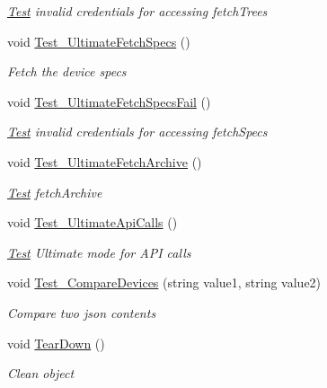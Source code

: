 \begin{DoxyCompactItemize}
\begin{DoxyCompactList}\small\item\em \hyperlink{namespace_h_d3_1_1_test}{Test} invalid credentials for accessing fetch\+Trees \end{DoxyCompactList}\item 
void \hyperlink{class_h_d3_1_1_test_1_1_h_d3_test_a73c8a709ce5f3dc9a3d4a5d1fed40cec}{Test\+\_\+\+Ultimate\+Fetch\+Specs} ()
\begin{DoxyCompactList}\small\item\em Fetch the device specs \end{DoxyCompactList}\item 
void \hyperlink{class_h_d3_1_1_test_1_1_h_d3_test_a9ff4c2f730c4e143315e358e0d642b82}{Test\+\_\+\+Ultimate\+Fetch\+Specs\+Fail} ()
\begin{DoxyCompactList}\small\item\em \hyperlink{namespace_h_d3_1_1_test}{Test} invalid credentials for accessing fetch\+Specs \end{DoxyCompactList}\item 
void \hyperlink{class_h_d3_1_1_test_1_1_h_d3_test_ab65dccff58ba727eeda7fcfce6ddb33d}{Test\+\_\+\+Ultimate\+Fetch\+Archive} ()
\begin{DoxyCompactList}\small\item\em \hyperlink{namespace_h_d3_1_1_test}{Test} fetch\+Archive \end{DoxyCompactList}\item 
void \hyperlink{class_h_d3_1_1_test_1_1_h_d3_test_a2fd12540acb809b5484317fb8add66e1}{Test\+\_\+\+Ultimate\+Api\+Calls} ()
\begin{DoxyCompactList}\small\item\em \hyperlink{namespace_h_d3_1_1_test}{Test} Ultimate mode for A\+P\+I calls \end{DoxyCompactList}\item 
void \hyperlink{class_h_d3_1_1_test_1_1_h_d3_test_a533abdaad86f0ce2ee427bfdb7449eba}{Test\+\_\+\+Compare\+Devices} (string value1, string value2)
\begin{DoxyCompactList}\small\item\em Compare two json contents \end{DoxyCompactList}\item 
void \hyperlink{class_h_d3_1_1_test_1_1_h_d3_test_a1faa92ff79c6f3c75bed12ebac5552cf}{Tear\+Down} ()
\begin{DoxyCompactList}\small\item\em Clean object \end{DoxyCompactList}\item 

\end{DoxyCompactItemize}
